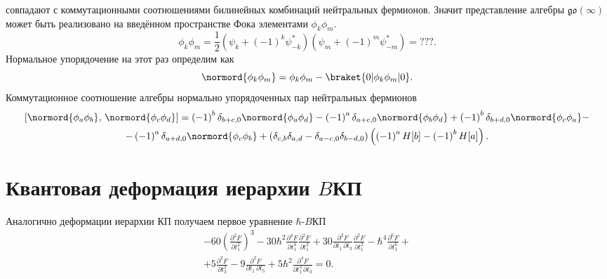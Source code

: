 \documentclass[a5paper,twoside]{extarticle}
\begin{document}
совпадают с коммутационными соотношениями билинейных
комбинаций нейтральных фермионов. Значит представление
алгебры $\mathfrak{go}(\infty)$ может быть реализовано
на введённом пространстве Фока элементами $\phi_k \phi_m$.
\[
	\phi_k \phi_m=
	\frac{1}{2}\left(\psi_k +\left( -1 \right) ^k \psi^*_{-k}
	\right)\left( \psi_m+\left( -1 \right) ^m \psi_{-m}^* \right) =???
.\] 
Нормальное упорядочение на этот раз определим как
\[
\normord{\phi_k \phi_m}= \phi_k \phi_m - \braket{0 | \phi_k
\phi_m| 0}
.\] 
Коммутационное соотношение алгебры нормально упорядоченных пар нейтральных
фермионов 
\begin{multline*}
	\left[ \normord{\phi_a \phi_b},\,\normord{\phi_c \phi_d} \right] =\left( -1 \right) ^b \delta_{b+c,0}
	\normord{\phi_a \phi_d}-\left( -1 \right) ^a
	\delta_{a+c,0}
	\normord{\phi_b \phi_d}+\left( -1 \right) ^b
	\delta_{b+d,0}\normord{\phi_c \phi_a}-\\-
	\left( -1 \right) ^a \delta_{a+d,0}
	\normord{\phi_c \phi_b}+
	\left(\delta_{c,b}\delta_{a,d}-\delta_{a-c,0}
	\delta_{b-d,0}\right) \left( 
\left( -1 \right) ^a H[b]-\left( -1 \right) ^b H[a]\right) 
.\end{multline*} 
\section{Квантовая деформация иерархии $B$КП}
Аналогично деформации иерархии КП получаем первое уравнение $\hbar $-$B$КП
\begin{multline}
-60 \left(\frac{\partial ^2F}{\partial
   t_1^2}\right)^3-30\hbar ^2 \frac{\partial ^4F}{\partial
   t_1^4} \frac{\partial ^2F}{\partial
   t_1^2}+30 \frac{\partial ^2F}{\partial t_1\, \partial t_3}
   \frac{\partial ^2F}{\partial t_1^2}-\hbar ^4\frac{\partial
   ^6F}{\partial t_1^6}+\\+5 \frac{\partial ^2F}{\partial
   t_3^2}-9 \frac{\partial ^2F}{\partial t_1\, \partial t_5}+5
   \hbar ^2\frac{\partial ^4F}{\partial t_1^3\, \partial t_3}=0	
	\label{}
.\end{multline}
\end{document}
